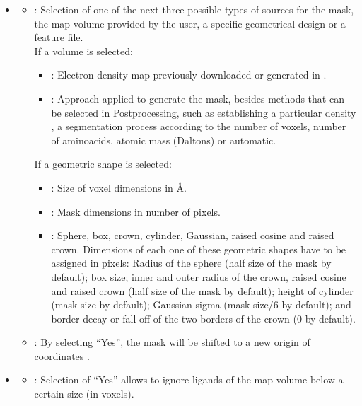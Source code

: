 \begin{itemize}
    \begin{itemize}
     \item {}
     \begin{itemize}
      \item {}: Selection of one of the next three possible types of sources for the mask, the map volume provided by the user, a specific geometrical design or a feature file.\\If a volume is selected:
        \begin{itemize}
        \item {}: Electron density map previously downloaded or generated in \scipion.
        \item {}: Approach applied to generate the mask, besides methods that can be selected in Postprocessing, such as establishing a particular density , a segmentation process according to the number of voxels, number of aminoacids, atomic mass (Daltons) or automatic.
        \end{itemize}
      If a geometric shape is selected:
        \begin{itemize}
        \item {}: Size of voxel dimensions in \AA.
        \item {}: Mask dimensions in number of pixels.
        \item {}: Sphere, box, crown, cylinder, Gaussian, raised cosine and raised crown. Dimensions of each one of these geometric shapes have to be assigned in pixels: Radius of the sphere (half size of the mask by default); box size; inner and outer radius of the crown, raised cosine and raised crown (half size of the mask by default); height of cylinder (mask size by default); Gaussian sigma (mask size/6 by default); and border decay or fall-off of the two borders of the crown (0 by default).
        \end{itemize}  
      \item {}: By selecting ``Yes'', the mask will be shifted to a new origin of coordinates .
     \end{itemize} 
     \item {}
     \begin{itemize}
     \item {}: Selection of ``Yes'' allows to ignore ligands of the map volume below a certain size (in voxels).

\end{itemize}
\end{itemize}
\end{itemize}
